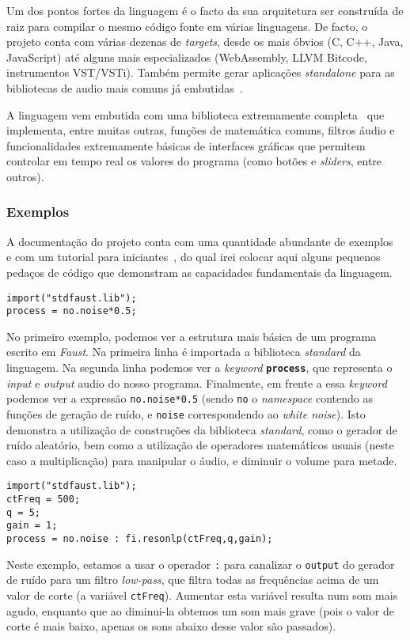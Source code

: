 Um dos pontos fortes da linguagem é o facto da sua arquitetura ser construída de raiz para compilar o mesmo código fonte em várias linguagens. De facto, o projeto conta com várias dezenas de \textit{targets}, desde os mais óbvios (C, C++, Java, JavaScript) até alguns mais especializados (WebAssembly, LLVM Bitcode, instrumentos VST/VSTi). Também permite gerar aplicações \textit{standalone} para as bibliotecas de audio mais comuns já embutidas~\cite{faust-targets}.
	
A linguagem vem embutida com uma biblioteca extremamente completa~\cite{faust-libraries} que implementa, entre muitas outras, funções de matemática comuns, filtros áudio e funcionalidades extremamente básicas de interfaces gráficas que permitem controlar em tempo real os valores do programa (como botões e \textit{sliders}, entre outros).
	
\subsubsection{Exemplos}
A documentação do projeto conta com uma quantidade abundante de exemplos~\cite{faust-examples} e com um tutorial para iniciantes~\cite{faust-quickstart}, do qual irei colocar aqui alguns pequenos pedaços de código que demonstram as capacidades fundamentais da linguagem.

\begin{lstlisting}[caption={Geração de ruído aleatório com volume a metade},captionpos=b]
import("stdfaust.lib");
process = no.noise*0.5;
\end{lstlisting}

No primeiro exemplo, podemos ver a estrutura mais básica de um programa escrito em \textit{Faust}. Na primeira linha é importada a biblioteca \textit{standard} da linguagem. Na segunda linha podemos ver a \textit{keyword} \textbf{\texttt{process}}, que representa o \textit{input} e \textit{output} audio do nosso programa. Finalmente, em frente a essa \textit{keyword} podemos ver a expressão \texttt{no.noise*0.5} (sendo \texttt{no} o \textit{namespace} contendo as funções de geração de ruído, e \texttt{noise} correspondendo ao \textit{white noise}). Isto demonstra a utilização de construções da biblioteca \textit{standard}, como o gerador de ruído aleatório, bem como a utilização de operadores matemáticos usuais (neste caso a multiplicação) para manipular o áudio, e diminuir o volume para metade.

\begin{lstlisting}[caption={Geração de ruído aleatório com um filtro \textit{low-pass}}]
import("stdfaust.lib");
ctFreq = 500;
q = 5;
gain = 1;
process = no.noise : fi.resonlp(ctFreq,q,gain);
\end{lstlisting}
Neste exemplo, estamos a usar o operador \texttt{:} para canalizar o \texttt{output} do gerador de ruído para um filtro \textit{low-pass}, que filtra todas as frequências acima de um valor de corte (a variável \texttt{ctFreq}). Aumentar esta variável resulta num som mais agudo, enquanto que ao diminui-la obtemos um som mais grave (pois o valor de corte é mais baixo, apenas os sons abaixo desse valor são passados).

